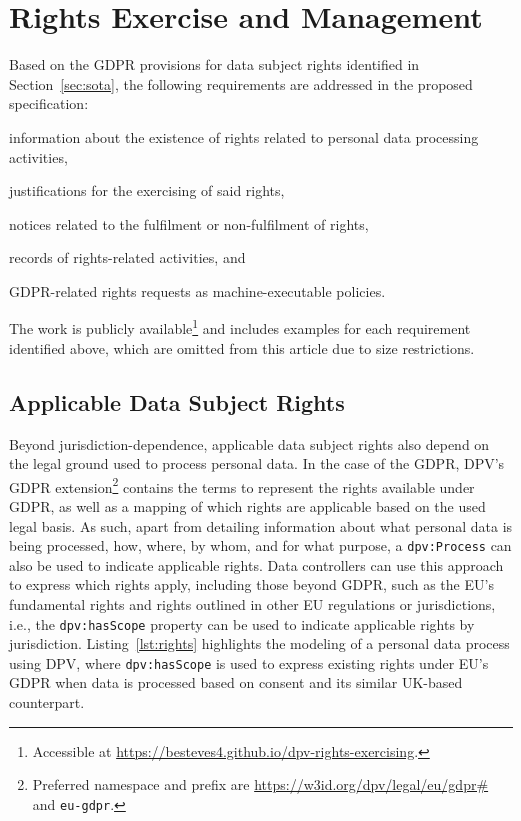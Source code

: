 \documentclass{IOS-Book-Article}     %
\begin{document}
\section{Rights Exercise and Management}
\label{sec:rights}

Based on the GDPR provisions for data subject rights identified in Section~\ref{sec:sota}, the following requirements are addressed in the proposed specification:
\begin{inlineabc}
    \item[(\textit{Section~\ref{sec:applicable-rights}})] information about the existence of rights related to personal data processing activities,
    \item[(\textit{Section~\ref{sec:justifications}})] justifications for the exercising of said rights,
    \item[(\textit{Section~\ref{sec:notices}})] notices related to the fulfilment or non-fulfilment of rights,
    \item[(\textit{Section~\ref{sec:records}})] records of rights-related activities, and
    \item[(\textit{Section~\ref{sec:policies}})] GDPR-related rights requests as machine-executable policies.
\end{inlineabc}
The work is publicly available\footnote{Accessible at  \url{https://besteves4.github.io/dpv-rights-exercising}.} and includes examples for each requirement identified above, which are omitted from this article due to size restrictions.

\subsection{Applicable Data Subject Rights}
\label{sec:applicable-rights}

Beyond jurisdiction-dependence, applicable data subject rights also depend on the legal ground used to process personal data.
In the case of the GDPR, DPV's GDPR extension\footnote{Preferred namespace and prefix are \url{https://w3id.org/dpv/legal/eu/gdpr\#} and \texttt{eu-gdpr}.} contains the terms to represent the rights available under GDPR, as well as a mapping of which rights are applicable based on the used legal basis.
As such, apart from detailing information about what personal data is being processed, how, where, by whom, and for what purpose, a \texttt{dpv:Process} can also be used to indicate applicable rights.
Data controllers can use this approach to express which rights apply, including those beyond GDPR, such as the EU’s fundamental rights and rights outlined in other EU regulations or jurisdictions, i.e., the \texttt{dpv:hasScope} property can be used to indicate applicable rights by jurisdiction.
Listing~\ref{lst:rights} highlights the modeling of a personal data process using DPV, where \texttt{dpv:hasScope} is used to express existing rights under EU's GDPR when data is processed based on consent and its similar UK-based counterpart.
\end{document}
